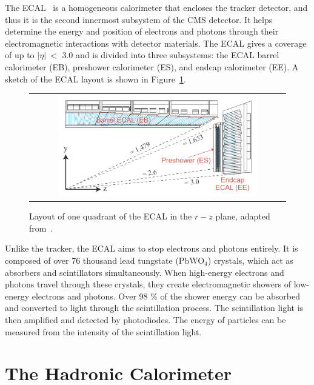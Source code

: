 The \ac{ECAL}~\cite{CMS:1997ysd} is a homogeneous calorimeter that encloses the tracker detector, and thus it is the second innermost subsystem of the \ac{CMS} detector. It helps determine the energy and position of electrons and photons through their electromagnetic interactions with detector materials. The \ac{ECAL} gives a coverage of up to $|\eta|~<$ 3.0 and is divided into three subsystems: the \ac{ECAL} barrel calorimeter (EB), preshower calorimeter (ES), and endcap calorimeter (EE). A sketch of the \ac{ECAL} layout is shown in Figure~\ref{fig:ECAL}.

\begin{figure}[tbh!]
 \begin{center}
 \begin{tabular}{c}
 \includegraphics[width=0.8\textwidth]{figures/Part2/CMS/ECAL}
 \end{tabular}
 \caption{Layout of one quadrant of the \ac{ECAL} in the $r-z$ plane, adapted from~\cite{Benaglia:2014aqa}.}
 \label{fig:ECAL}
 \end{center}
\end{figure}

Unlike the tracker, the \ac{ECAL} aims to stop electrons and photons entirely. It is composed of over 76 thousand lead tungstate (PbWO$_{4}$) crystals, which act as absorbers and scintillators simultaneously. When high-energy electrons and photons travel through these crystals, they create electromagnetic showers of low-energy electrons and photons. Over 98 \% of the shower energy can be absorbed and converted to light through the scintillation process. The scintillation light is then amplified and detected by photodiodes. The energy of particles can be measured from the intensity of the scintillation light.

\section{The Hadronic Calorimeter}
\label{sec:HCAL}


